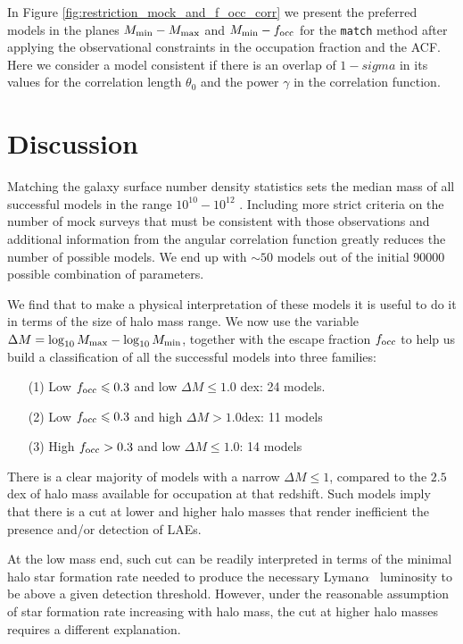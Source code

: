 \documentclass[usenatbib]{mn2e}
\newcommand{\hMsun}{{\ifmmode{h^{-1}{\rm
        {M_{\odot}}}}\else{$h^{-1}{\rm{M_{\odot}}}$}\fi}}
\newcommand{\lya}{{Lyman$\alpha$~}}
\begin{document}
In Figure \ref{fig:restriction_mock_and_f_occ_corr} we present the preferred
models in the planes $M_{\rm min}-M_{\rm  max}$ and $M_{\rm min}-f_{\rm occ}$
for the {\tt match} method after applying the observational constraints 
in the occupation fraction and the ACF. Here we consider a model
consistent if there is an overlap of $1-sigma$ in its values for the
correlation length $\theta_0$ and the power $\gamma$ in the
correlation function.  


\section{Discussion}

Matching the galaxy surface number density statistics sets the median
mass of all successful models in the range $10^{10}-10^{12}$
\hMsun. Including more strict criteria on the number of mock surveys
that must be consistent with those observations and additional
information from the angular correlation function greatly reduces the
number of possible models. We end up with $\sim 50$ models out of the
initial 90000 possible combination of parameters.  

We find that to make a physical interpretation of these models it is
useful to do it in terms of the size of halo mass range. We now use the
variable $\Delta M=\log_{10}M_{\rm max} - \log_{10}M_{\rm  min}$, together
with the escape fraction $f_{\rm occ}$ to help us build a classification
of all the successful models into three families: 


\begin{itemize}
\item[(1)] Low $f_{\rm occ}\leq 0.3$ and low $\Delta M\leq 1.0$
  dex: 24 models.
\item[(2)] Low $f_{\rm occ}\leq 0.3$ and high $\Delta M > 1.0$dex: 11
  models
\item[(3)] High $f_{\rm occ}> 0.3$ and low $\Delta M\leq 1.0$: 14 models
\end{itemize}

There is a clear majority of models with a narrow $\Delta M\leq
1$, compared to the $2.5$dex of halo mass available for occupation at
that redshift. Such models imply that there is a cut at lower and higher halo
masses that render inefficient the presence and/or detection of LAEs.

At the low mass end, such cut can be readily interpreted in terms of the
minimal halo star formation rate needed to produce the necessary \lya
luminosity to be above a given detection threshold.  However, under
the reasonable assumption of star formation rate increasing with halo
mass, the cut at higher halo masses requires a different explanation. 
\end{document}
